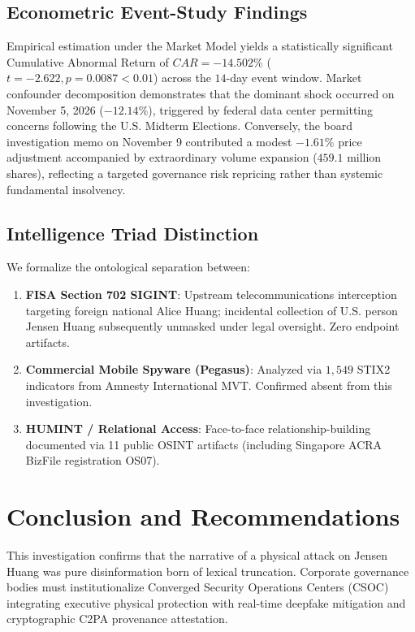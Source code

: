 \documentclass[journal,10pt,compsoc]{IEEEtran}
\begin{document}
\subsection{Econometric Event-Study Findings}
Empirical estimation under the Market Model yields a statistically significant Cumulative Abnormal Return of $CAR = -14.502\%$ ($t = -2.622, p = 0.0087 < 0.01$) across the $14$-day event window. Market confounder decomposition demonstrates that the dominant shock occurred on November 5, 2026 ($-12.14\%$), triggered by federal data center permitting concerns following the U.S. Midterm Elections. Conversely, the board investigation memo on November 9 contributed a modest $-1.61\%$ price adjustment accompanied by extraordinary volume expansion ($459.1\text{ million}$ shares), reflecting a targeted governance risk repricing rather than systemic fundamental insolvency.

\subsection{Intelligence Triad Distinction}
We formalize the ontological separation between:
\begin{enumerate}
    \item \textbf{FISA Section 702 SIGINT}: Upstream telecommunications interception targeting foreign national Alice Huang; incidental collection of U.S. person Jensen Huang subsequently unmasked under legal oversight. Zero endpoint artifacts.
    \item \textbf{Commercial Mobile Spyware (Pegasus)}: Analyzed via $1,549$ STIX2 indicators from Amnesty International MVT. Confirmed absent from this investigation.
    \item \textbf{HUMINT / Relational Access}: Face-to-face relationship-building documented via 11 public OSINT artifacts (including Singapore ACRA BizFile registration OS07).
\end{enumerate}

\section{Conclusion and Recommendations}
This investigation confirms that the narrative of a physical attack on Jensen Huang was pure disinformation born of lexical truncation. Corporate governance bodies must institutionalize Converged Security Operations Centers (CSOC) integrating executive physical protection with real-time deepfake mitigation and cryptographic C2PA provenance attestation.



\end{document}
